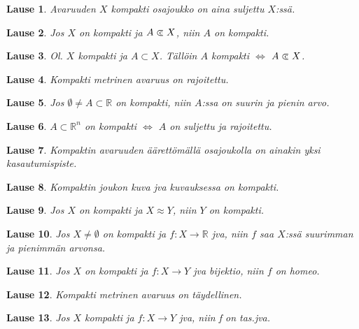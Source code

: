 \documentclass[landscape,a4paper,10pt]{article}
\newcommand\cls{\mathrel{\ooalign{$\subset$\cr
\hidewidth\raise.225ex\hbox{$\text{{\scriptsize c}}\mkern2mu$}\cr}}}
\theoremstyle{customtheoremstyle}
\newtheorem*{theorem}{Lause}
\begin{document}
\begin{multicols*}{3}

\begin{theorem}
  Avaruuden $X$ kompakti osajoukko on aina suljettu $X$:ssä.
\end{theorem}

\begin{theorem}
  Jos $X$ on kompakti ja $A \cls X$, niin $A$ on kompakti.
\end{theorem}

\begin{theorem}
  Ol. $X$ kompakti ja $A \subset X$. Tällöin $A$ kompakti $\iff$ $A \cls X$.
\end{theorem}

\begin{theorem}
  Kompakti metrinen avaruus on rajoitettu.
\end{theorem}

\begin{theorem}
  Jos $\emptyset \neq A \subset \mathbb{R}$ on kompakti, niin $A$:ssa on suurin
  ja pienin arvo.
\end{theorem}

\begin{theorem}
  $A \subset \mathbb{R}^n$ on kompakti $\iff$ $A$ on suljettu ja rajoitettu.
\end{theorem}

\begin{theorem}
  Kompaktin avaruuden äärettömällä osajoukolla on ainakin yksi kasautumispiste.
\end{theorem}

\begin{theorem}
  Kompaktin joukon kuva jva kuvauksessa on kompakti.
\end{theorem}

\begin{theorem}
  Jos $X$ on kompakti ja $X \approx Y$, niin $Y$ on kompakti.
\end{theorem}

\begin{theorem}
  Jos $X \neq \emptyset$ on kompakti ja $f: X \rightarrow \mathbb{R}$ jva, niin
  $f$ saa $X$:ssä suurimman ja pienimmän arvonsa.
\end{theorem}

\begin{theorem}
  Jos $X$ on kompakti ja $f: X \rightarrow Y$ jva bijektio, niin $f$ on homeo.
\end{theorem}

\begin{theorem}
  Kompakti metrinen avaruus on täydellinen.
\end{theorem}

\begin{theorem}
  Jos $X$ kompakti ja $f: X \rightarrow Y$ jva, niin f on tas.jva.
\end{theorem}


\end{multicols*}
\end{document}
